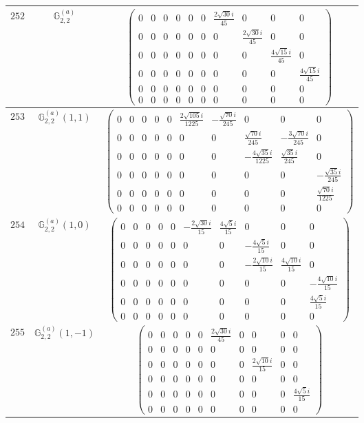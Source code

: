 \documentclass[fleqn,8pt,landscape]{jsarticle}
\begin{document}
\begin{center}
\begin{longtable}{ccc}
$ 252 $ & $ \mathbb{G}_{2,2}^{(a)} $ & $ \begin{pmatrix} 0 & 0 & 0 & 0 & 0 & 0 & \frac{2 \sqrt{30} i}{45} & 0 & 0 & 0 \\ 0 & 0 & 0 & 0 & 0 & 0 & 0 & \frac{2 \sqrt{30} i}{45} & 0 & 0 \\ 0 & 0 & 0 & 0 & 0 & 0 & 0 & 0 & \frac{4 \sqrt{15} i}{45} & 0 \\ 0 & 0 & 0 & 0 & 0 & 0 & 0 & 0 & 0 & \frac{4 \sqrt{15} i}{45} \\ 0 & 0 & 0 & 0 & 0 & 0 & 0 & 0 & 0 & 0 \\ 0 & 0 & 0 & 0 & 0 & 0 & 0 & 0 & 0 & 0 \end{pmatrix} $ \\ \hline
$ 253 $ & $ \mathbb{G}_{2,2}^{(a)}(1,1) $ & $ \begin{pmatrix} 0 & 0 & 0 & 0 & 0 & \frac{2 \sqrt{105} i}{1225} & - \frac{\sqrt{70} i}{245} & 0 & 0 & 0 \\ 0 & 0 & 0 & 0 & 0 & 0 & 0 & \frac{\sqrt{70} i}{245} & - \frac{3 \sqrt{70} i}{245} & 0 \\ 0 & 0 & 0 & 0 & 0 & 0 & 0 & - \frac{4 \sqrt{35} i}{1225} & \frac{\sqrt{35} i}{245} & 0 \\ 0 & 0 & 0 & 0 & 0 & 0 & 0 & 0 & 0 & - \frac{\sqrt{35} i}{245} \\ 0 & 0 & 0 & 0 & 0 & 0 & 0 & 0 & 0 & \frac{\sqrt{70} i}{1225} \\ 0 & 0 & 0 & 0 & 0 & 0 & 0 & 0 & 0 & 0 \end{pmatrix} $ \\ \hline
$ 254 $ & $ \mathbb{G}_{2,2}^{(a)}(1,0) $ & $ \begin{pmatrix} 0 & 0 & 0 & 0 & 0 & - \frac{2 \sqrt{30} i}{15} & \frac{4 \sqrt{5} i}{15} & 0 & 0 & 0 \\ 0 & 0 & 0 & 0 & 0 & 0 & 0 & - \frac{4 \sqrt{5} i}{15} & 0 & 0 \\ 0 & 0 & 0 & 0 & 0 & 0 & 0 & - \frac{2 \sqrt{10} i}{15} & \frac{4 \sqrt{10} i}{15} & 0 \\ 0 & 0 & 0 & 0 & 0 & 0 & 0 & 0 & 0 & - \frac{4 \sqrt{10} i}{15} \\ 0 & 0 & 0 & 0 & 0 & 0 & 0 & 0 & 0 & \frac{4 \sqrt{5} i}{15} \\ 0 & 0 & 0 & 0 & 0 & 0 & 0 & 0 & 0 & 0 \end{pmatrix} $ \\ \hline
$ 255 $ & $ \mathbb{G}_{2,2}^{(a)}(1,-1) $ & $ \begin{pmatrix} 0 & 0 & 0 & 0 & 0 & \frac{2 \sqrt{30} i}{45} & 0 & 0 & 0 & 0 \\ 0 & 0 & 0 & 0 & 0 & 0 & 0 & 0 & 0 & 0 \\ 0 & 0 & 0 & 0 & 0 & 0 & 0 & \frac{2 \sqrt{10} i}{15} & 0 & 0 \\ 0 & 0 & 0 & 0 & 0 & 0 & 0 & 0 & 0 & 0 \\ 0 & 0 & 0 & 0 & 0 & 0 & 0 & 0 & 0 & \frac{4 \sqrt{5} i}{15} \\ 0 & 0 & 0 & 0 & 0 & 0 & 0 & 0 & 0 & 0 \end{pmatrix} $ \\ \hline

\end{longtable}
\end{center}
\end{document}
